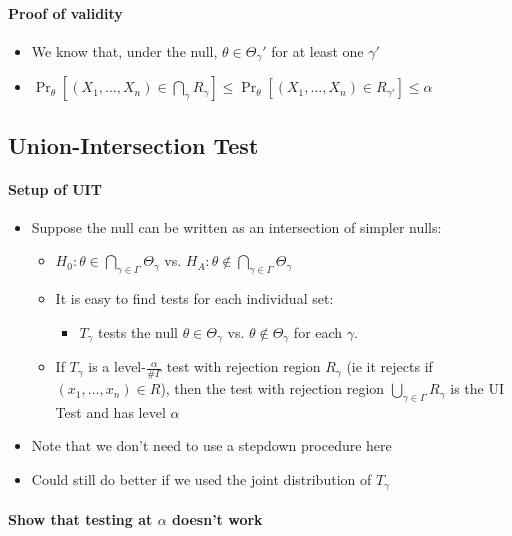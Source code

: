 \paragraph{Proof of validity}
\label{sec-3-1-1}

\begin{itemize}
\item We know that, under the null, $\theta \in \Theta_\gamma'$ for at least one $\gamma'$
\item $\Pr_\theta[(X_1,\dots,X_n) \in \bigcap_\gamma R_\gamma] \leq \Pr_\theta[(X_1,\dots, X_n) \in R_{\gamma'}] \leq \alpha$
\end{itemize}
\subsection{Union-Intersection Test}
\label{sec-3-2}
\paragraph{Setup of UIT}
\label{sec-3-2-1}

\begin{itemize}
\item Suppose the null can be written as an intersection of simpler nulls:
\begin{itemize}
\item $H_0: \theta \in \bigcap_{\gamma \in \Gamma} \Theta_\gamma$ vs. 
         $H_A: \theta \notin \bigcap_{\gamma \in \Gamma} \Theta_\gamma$
\item It is easy to find tests for each individual set:
\begin{itemize}
\item $T_\gamma$ tests the null $\theta \in \Theta_\gamma$
           vs. $\theta \notin \Theta_\gamma$ for each $\gamma$.
\end{itemize}
\item If $T_\gamma$ is a level-$\frac{\alpha}{\# \Gamma}$ test with
         rejection region $R_\gamma$ (ie it rejects if
         $(x_1,\dots,x_n) \in R$), then the test with rejection region
         $\bigcup_{\gamma \in \Gamma} R_\gamma$ is the UI Test and has
         level $\alpha$
\end{itemize}
\item Note that we don't need to use a stepdown procedure here
\item Could still do better if we used the joint distribution of $T_\gamma$
\end{itemize}
\paragraph{Show that testing at $\alpha$ doesn't work}
\label{sec-3-2-2}
